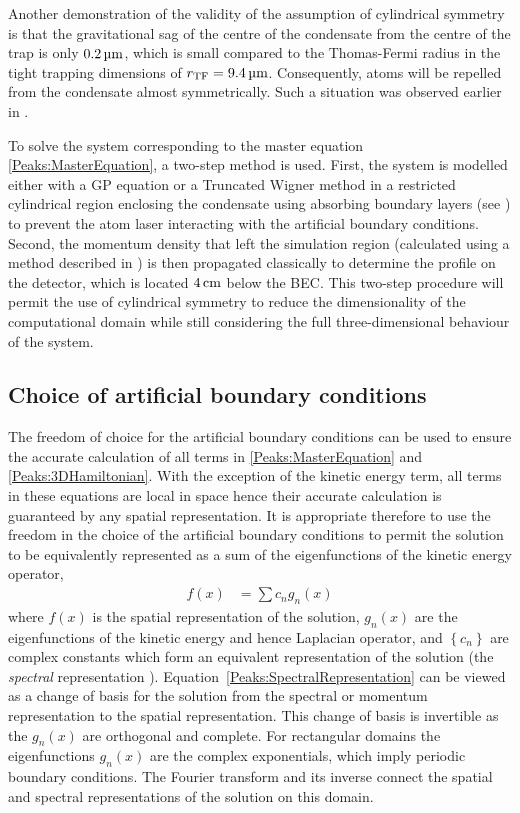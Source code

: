 Another demonstration of the validity of the assumption of cylindrical symmetry is that the gravitational sag of the centre of the condensate from the centre of the trap is only $\unit[0.2]{\micro m}$, which is small compared to the Thomas-Fermi radius in the tight trapping dimensions of $r_\text{TF} = \unit[9.4]{\micro m}$. Consequently, atoms will be repelled from the condensate almost symmetrically. Such a situation was observed earlier in .

To solve the system corresponding to the master equation \eqref{Peaks:MasterEquation}, a two-step method is used. First, the system is modelled either with a GP equation or a Truncated Wigner method in a restricted cylindrical region enclosing the condensate using absorbing boundary layers (see ) to prevent the atom laser interacting with the artificial boundary conditions. Second, the momentum density that left the simulation region (calculated using a method described in ) is then propagated classically to determine the profile on the detector, which is located $\unit[4]{cm}$ below the BEC. This two-step procedure will permit the use of cylindrical symmetry to reduce the dimensionality of the computational domain while still considering the full three-dimensional behaviour of the system.

\subsection{Choice of artificial boundary conditions}

The freedom of choice for the artificial boundary conditions can be used to ensure the accurate calculation of all terms in \eqref{Peaks:MasterEquation} and \eqref{Peaks:3DHamiltonian}. With the exception of the kinetic energy term, all terms in these equations are local in space hence their accurate calculation is guaranteed by any spatial representation. It is appropriate therefore to use the freedom in the choice of the artificial boundary conditions to permit the solution to be equivalently represented as a sum of the eigenfunctions of the kinetic energy operator,
\begin{align}
    \label{Peaks:SpectralRepresentation}
    f(x) &= \sum c_n g_n (x)
\end{align} 
where $f(x)$ is the spatial representation of the solution, $g_n(x)$ are the eigenfunctions of the kinetic energy and hence Laplacian operator, and $\left\{c_n\right\}$ are complex constants which form an equivalent representation of the solution (the \emph{spectral} representation \citep{Boyd:2000}). Equation~\eqref{Peaks:SpectralRepresentation} can be viewed as a change of basis for the solution from the spectral or momentum representation to the spatial representation. This change of basis is invertible as the $g_n(x)$ are orthogonal and complete. For rectangular domains the eigenfunctions $g_n(x)$ are the complex exponentials, which imply periodic boundary conditions. The Fourier transform and its inverse connect the spatial and spectral representations of the solution on this domain.


